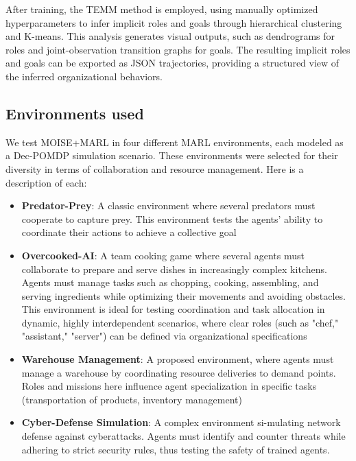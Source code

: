 \documentclass[sigconf]{aamas}
\begin{document}
After training, the TEMM method is employed, using manually optimized hyperparameters to infer implicit roles and goals through hierarchical clustering and K-means. This analysis generates visual outputs, such as dendrograms for roles and joint-observation transition graphs for goals. The resulting implicit roles and goals can be exported as JSON trajectories, providing a structured view of the inferred organizational behaviors.


\subsection{Environments used}

We test MOISE+MARL in four different MARL environments, each modeled as a Dec-POMDP simulation scenario. These environments were selected for their diversity in terms of collaboration and resource management. Here is a description of each:

\begin{itemize}

    \item \textbf{Predator-Prey}: A classic environment where several predators must cooperate to capture prey. This environment tests the agents' ability to coordinate their actions to achieve a collective goal\cite{lowe2017multi}

    \item \textbf{Overcooked-AI}: A team cooking game where several agents must collaborate to prepare and serve dishes in increasingly complex kitchens\cite{overcookedai}. Agents must manage tasks such as chopping, cooking, assembling, and serving ingredients while optimizing their movements and avoiding obstacles. This environment is ideal for testing coordination and task allocation in dynamic, highly interdependent scenarios, where clear roles (such as "chef," "assistant," "server") can be defined via organizational specifications
    
    \item \textbf{Warehouse Management}: A proposed environment, where agents must manage a warehouse by coordinating resource deliveries to demand points. Roles and missions here influence agent specialization in specific tasks (transportation of products, inventory management)
    
    \item \textbf{Cyber-Defense Simulation}: A complex environment si-mulating network defense against cyberattacks. Agents must identify and counter threats while adhering to strict security rules, thus testing the safety of trained agents\cite{Maxwell2021}.
\end{itemize}
\end{document}
